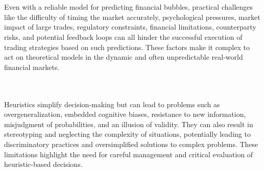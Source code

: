 \documentclass[12pt]{article}
\begin{document}
\begin{enumerate}
 \\ \\ 
Even with a reliable model for predicting financial bubbles, practical challenges like the difficulty of timing the market accurately, psychological pressures, market impact of large trades, regulatory constraints, financial limitations, counterparty risks, and potential feedback loops can all hinder the successful execution of trading strategies based on such predictions. These factors make it complex to act on theoretical models in the dynamic and often unpredictable real-world financial markets.

 \\ \\ 
Heuristics simplify decision-making but can lead to problems such as overgeneralization, embedded cognitive biases, resistance to new information, misjudgment of probabilities, and an illusion of validity. They can also result in stereotyping and neglecting the complexity of situations, potentially leading to discriminatory practices and oversimplified solutions to complex problems. These limitations highlight the need for careful management and critical evaluation of heuristic-based decisions.

\end{enumerate}

\newpage 
{}
\end{document}
